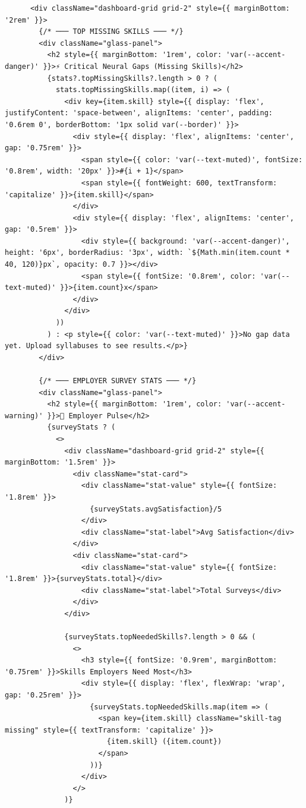 \documentclass[12pt,a4paper]{report}
\begin{document}
\begin{verbatim}
      <div className="dashboard-grid grid-2" style={{ marginBottom: '2rem' }}>
        {/* ─── TOP MISSING SKILLS ─── */}
        <div className="glass-panel">
          <h2 style={{ marginBottom: '1rem', color: 'var(--accent-danger)' }}>⚡ Critical Neural Gaps (Missing Skills)</h2>
          {stats?.topMissingSkills?.length > 0 ? (
            stats.topMissingSkills.map((item, i) => (
              <div key={item.skill} style={{ display: 'flex', justifyContent: 'space-between', alignItems: 'center', padding: '0.6rem 0', borderBottom: '1px solid var(--border)' }}>
                <div style={{ display: 'flex', alignItems: 'center', gap: '0.75rem' }}>
                  <span style={{ color: 'var(--text-muted)', fontSize: '0.8rem', width: '20px' }}>#{i + 1}</span>
                  <span style={{ fontWeight: 600, textTransform: 'capitalize' }}>{item.skill}</span>
                </div>
                <div style={{ display: 'flex', alignItems: 'center', gap: '0.5rem' }}>
                  <div style={{ background: 'var(--accent-danger)', height: '6px', borderRadius: '3px', width: `${Math.min(item.count * 40, 120)}px`, opacity: 0.7 }}></div>
                  <span style={{ fontSize: '0.8rem', color: 'var(--text-muted)' }}>{item.count}x</span>
                </div>
              </div>
            ))
          ) : <p style={{ color: 'var(--text-muted)' }}>No gap data yet. Upload syllabuses to see results.</p>}
        </div>

        {/* ─── EMPLOYER SURVEY STATS ─── */}
        <div className="glass-panel">
          <h2 style={{ marginBottom: '1rem', color: 'var(--accent-warning)' }}>🔮 Employer Pulse</h2>
          {surveyStats ? (
            <>
              <div className="dashboard-grid grid-2" style={{ marginBottom: '1.5rem' }}>
                <div className="stat-card">
                  <div className="stat-value" style={{ fontSize: '1.8rem' }}>
                    {surveyStats.avgSatisfaction}/5
                  </div>
                  <div className="stat-label">Avg Satisfaction</div>
                </div>
                <div className="stat-card">
                  <div className="stat-value" style={{ fontSize: '1.8rem' }}>{surveyStats.total}</div>
                  <div className="stat-label">Total Surveys</div>
                </div>
              </div>

              {surveyStats.topNeededSkills?.length > 0 && (
                <>
                  <h3 style={{ fontSize: '0.9rem', marginBottom: '0.75rem' }}>Skills Employers Need Most</h3>
                  <div style={{ display: 'flex', flexWrap: 'wrap', gap: '0.25rem' }}>
                    {surveyStats.topNeededSkills.map(item => (
                      <span key={item.skill} className="skill-tag missing" style={{ textTransform: 'capitalize' }}>
                        {item.skill} ({item.count})
                      </span>
                    ))}
                  </div>
                </>
              )}


\end{verbatim}
\end{document}
